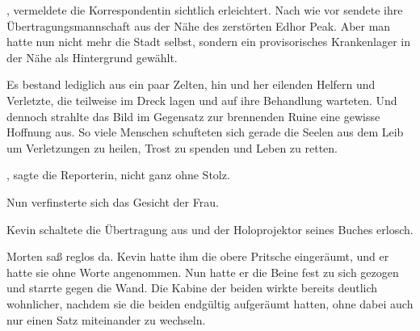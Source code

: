 , vermeldete die Korrespondentin sichtlich erleichtert. Nach wie vor sendete ihre Übertragungsmannschaft aus der Nähe des zerstörten Edhor Peak. Aber man hatte nun nicht mehr die Stadt selbst, sondern ein provisorisches Krankenlager in der Nähe als Hintergrund gewählt.

\par

Es bestand lediglich aus ein paar Zelten, hin und her eilenden Helfern und Verletzte, die teilweise im Dreck lagen und auf ihre Behandlung warteten. Und dennoch strahlte das Bild im Gegensatz zur brennenden Ruine eine gewisse Hoffnung aus. So viele Menschen schufteten sich gerade die Seelen aus dem Leib um Verletzungen zu heilen, Trost zu spenden und Leben zu retten.

\par

, sagte die Reporterin, nicht ganz ohne Stolz. 

\par

Nun verfinsterte sich das Gesicht der Frau. 

\par

Kevin schaltete die Übertragung aus und der Holoprojektor seines Buches erlosch. 

\par

Morten saß reglos da. Kevin hatte ihm die obere Pritsche eingeräumt, und er hatte sie ohne Worte angenommen. Nun hatte er die Beine fest zu sich gezogen und starrte gegen die Wand. Die Kabine der beiden wirkte bereits deutlich wohnlicher, nachdem sie die beiden endgültig aufgeräumt hatten, ohne dabei auch nur einen Satz miteinander zu wechseln.

